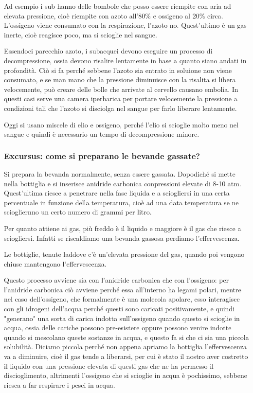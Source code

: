 Ad esempio i sub hanno delle bombole che posso essere riempite con aria ad elevata pressione, cioè riempite con azoto all'80\% e ossigeno al 20\% circa. L'ossigeno viene consumato con la respirazione, l'azoto no. Quest'ultimo è un gas inerte, cioè reagisce poco, ma si scioglie nel sangue.

Essendoci parecchio azoto, i subacquei devono eseguire un processo di decompressione, ossia devono risalire lentamente in base a quanto siano andati in profondità. Ciò si fa perché sebbene l'azoto sia entrato in soluione non viene consumato, e se man mano che la pressione diminuisce con la risalita si libera velocemente, può creare delle bolle che arrivate al cervello causano embolia. In questi casi serve una camera iperbarica per portare velocemente la pressione a condizioni tali che l'azoto si disciolga nel sangue per farlo liberare lentamente.

Oggi si usano miscele di elio e ossigeno, perché l'elio si scioglie molto meno nel sangue e quindi è necessario un tempo di decompressione minore.

\subsubsection{Excursus: come si preparano le bevande gassate?}

Si prepara la bevanda normalmente, senza essere gassata. Dopodiché si mette nella bottiglia e si inserisce anidride carbonica conpressioni elevate di 8-10 atm. Quest'ultima riesce a penetrare nella fase liquida e a sciogliersi in una certa percentuale in funzione della temperatura, cioè ad una data temperatura se ne sciogliernno un certo numero di grammi per litro. 

Per quanto attiene ai gas, più freddo è il liquido e maggiore è il gas che riesce a sciogliersi. Infatti se riscaldiamo una bevanda gassosa perdiamo l'effervescenza.

Le bottiglie, tenute laddove c'è un'elevata pressione del gas, quando poi vengono chiuse mantengono l'effervescenza.

Questo processo avviene sia con l'anidride carbonica che con l'ossigeno: per l'anidride carbonica ciò avviene perché essa all'interno ha legami polari, mentre nel caso dell'ossigeno, che formalmente è una molecola apolare, esso interagisce con gli idrogeni dell'acqua perché questi sono caricati positivamente, e quindi "generano" una sorta di carica indotta sull'ossigeno quando questo si scioglie in acqua, ossia delle cariche possono pre-esistere oppure possono venire indotte quando si mescolano queste sostanze in acqua, e questo fa si che ci sia una piccola solubilità. Diciamo piccola perché non appena apriamo la bottiglia l'effervescenza va a diminuire, cioè il gas tende a liberarsi, per cui è stato il nostro aver costretto il liquido con una pressione elevata di questi gas che ne ha permesso il discioglimento, altrimenti l'ossigeno che si scioglie in acqua è pochissimo, sebbene riesca a far respirare i pesci in acqua.


